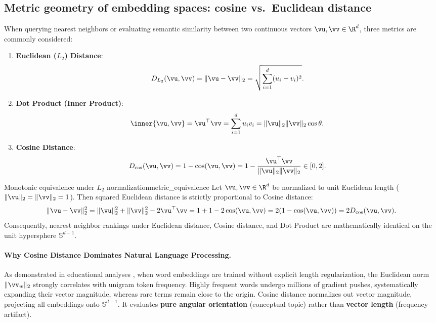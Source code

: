 \documentclass[../../main.tex]{subfiles}
\begin{document}
\subsection{Metric geometry of embedding spaces: cosine vs.~Euclidean distance}
\label{subsec:metric_geometry}

When querying nearest neighbors or evaluating semantic similarity between two continuous vectors $\vu, \vv \in \R^d$, three metrics are commonly considered:
\begin{enumerate}
    \item \textbf{Euclidean ($L_2$) Distance}:
    \begin{equation}
    \label{eq:euclidean_dist}
    D_{L_2}(\vu, \vv) = \|\vu - \vv\|_2 = \sqrt{\sum_{i=1}^d (u_i - v_i)^2}.
    \end{equation}
    \item \textbf{Dot Product (Inner Product)}:
    \begin{equation}
    \label{eq:dot_prod_metric}
    \inner{\vu, \vv} = \vu^\top \vv = \sum_{i=1}^d u_i v_i = \|\vu\|_2 \|\vv\|_2 \cos \theta.
    \end{equation}
    \item \textbf{Cosine Distance}:
    \begin{equation}
    \label{eq:cosine_dist_def}
    D_{\cos}(\vu, \vv) = 1 - \cos(\vu, \vv) = 1 - \frac{\vu^\top \vv}{\|\vu\|_2 \|\vv\|_2} \in [0, 2].
    \end{equation}
\end{enumerate}

\begin{theorem}{Monotonic equivalence under $L_2$ normalization}{metric_equivalence}
Let $\vu, \vv \in \R^d$ be normalized to unit Euclidean length ($\|\vu\|_2 = \|\vv\|_2 = 1$). Then squared Euclidean distance is strictly proportional to Cosine distance:
\begin{equation}
\label{eq:unit_norm_equiv}
\|\vu - \vv\|_2^2 = \|\vu\|_2^2 + \|\vv\|_2^2 - 2 \vu^\top \vv = 1 + 1 - 2 \cos(\vu, \vv) = 2(1 - \cos(\vu, \vv)) = 2 D_{\cos}(\vu, \vv).
\end{equation}
Consequently, nearest neighbor rankings under Euclidean distance, Cosine distance, and Dot Product are mathematically identical on the unit hypersphere $\mathbb{S}^{d-1}$.
\end{theorem}

\paragraph{Why Cosine Distance Dominates Natural Language Processing.}
As demonstrated in educational analyses \cite{enkk2023embeddings}, when word embeddings are trained without explicit length regularization, the Euclidean norm $\|\vv_w\|_2$ strongly correlates with unigram token frequency. Highly frequent words undergo millions of gradient pushes, systematically expanding their vector magnitude, whereas rare terms remain close to the origin.
Cosine distance normalizes out vector magnitude, projecting all embeddings onto $\mathbb{S}^{d-1}$. It evaluates \textbf{pure angular orientation} (conceptual topic) rather than \textbf{vector length} (frequency artifact).
\end{document}
